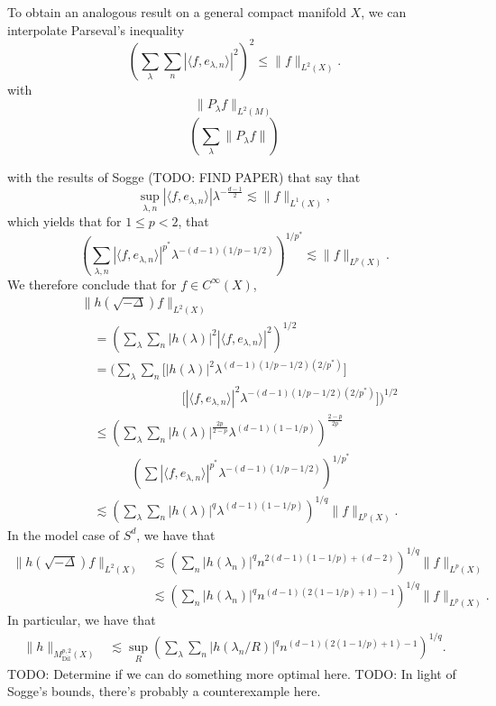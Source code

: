 %


%
To obtain an analogous result on a general compact manifold $X$, we can interpolate Parseval's inequality
%
\[ \left( \sum_\lambda \sum_n |\langle f, e_{\lambda,n} \rangle|^2 \right)^2 \leq \| f \|_{L^2(X)}. \]
%
with
%
\[ \| P_\lambda f \|_{L^2(M)} \]
\[ \left( \sum_\lambda \| P_\lambda f \| \right) \]

with the results of Sogge (TODO: FIND PAPER) that say that
%
\[ \sup_{\lambda,n} |\langle f, e_{\lambda,n} \rangle| \lambda^{- \frac{d-1}{2}} \lesssim \| f \|_{L^1(X)}, \]
%
which yields that for $1 \leq p < 2$, that
\[ \left( \sum_{\lambda,n} |\langle f, e_{\lambda,n} \rangle|^{p^*} \lambda^{- (d-1)(1/p - 1/2)} \right)^{1/p^*} \lesssim \| f \|_{L^p(X)}. \]
%
We therefore conclude that for $f \in C^\infty(X)$,
%
\begin{align*}
    &\| h(\sqrt{-\Delta}) f \|_{L^2(X)}\\
    &\quad= \left( \sum_\lambda \sum_n |h(\lambda)|^2 |\langle f, e_{\lambda,n} \rangle|^2 \right)^{1/2}\\
    &\quad= \Bigg( \sum_\lambda \sum_n \Big[ |h(\lambda)|^2 \lambda^{(d-1)(1/p - 1/2)(2/p^*)} \Big]\\
    &\quad\quad\quad\quad\quad\quad\quad\quad \Big[ |\langle f, e_{\lambda,n} \rangle|^2 \lambda^{-(d-1)(1/p - 1/2)(2/p^*)} \Big] \Bigg)^{1/2}\\
    &\quad\leq \left( \sum_\lambda \sum_n |h(\lambda)|^{\frac{2p}{2-p}} \lambda^{(d-1)(1 - 1/p)} \right)^{\frac{2-p}{2p}}\\
    &\quad\quad\quad\quad \left( \sum |\langle f, e_{\lambda,n} \rangle|^{p^*} \lambda^{-(d-1)(1/p - 1/2)} \right)^{1/p^*}\\
    &\quad\lesssim \left( \sum_\lambda \sum_n |h(\lambda)|^q \lambda^{(d-1)(1 - 1/p)} \right)^{1/q} \| f \|_{L^p(X)}.
\end{align*}
%
In the model case of $S^d$, we have that
%
\begin{align*}
    \| h(\sqrt{-\Delta}) f \|_{L^2(X)} &\lesssim \left( \sum_n |h(\lambda_n)|^q n^{2(d-1)(1 - 1/p) + (d-2)} \right)^{1/q} \| f \|_{L^p(X)}\\
    &\lesssim \left( \sum_n |h(\lambda_n)|^q n^{(d-1)(2(1 - 1/p) + 1) - 1} \right)^{1/q} \| f \|_{L^p(X)}.
\end{align*}
%
In particular, we have that
%
\begin{align*}
    \| h \|_{M^{p,2}_{\text{Dil}}(X)} &\lesssim \sup_R \left( \sum_\lambda \sum_n |h(\lambda_n/R)|^q n^{(d-1)(2(1 - 1/p) + 1) - 1} \right)^{1/q}.
\end{align*}
%
TODO: Determine if we can do something more optimal here. TODO: In light of Sogge's bounds, there's probably a counterexample here.

